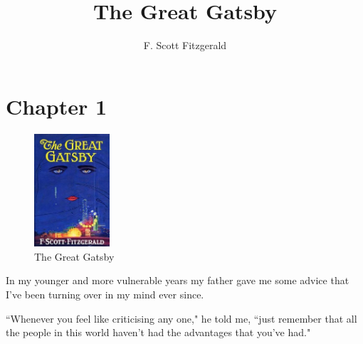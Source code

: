 \documentclass[a4paper,12pt]{article}
\title{The Great Gatsby}
\author{F. Scott Fitzgerald}
\date{}
\begin{document}
\maketitle
\section{Chapter 1}

\begin{figure}[b!]
   \centering
     \includegraphics[width=0.25\textwidth]{images/jacket.jpg}
   \caption{The Great Gatsby}
\end{figure}

In my younger and more vulnerable years my father gave me some advice that I've been turning over in my mind ever since.

``Whenever you feel like criticising any one," he told me, ``just
remember that all the people in this world haven't had the advantages
that you've had." \cite{my_cite_ref}



\end{document}
